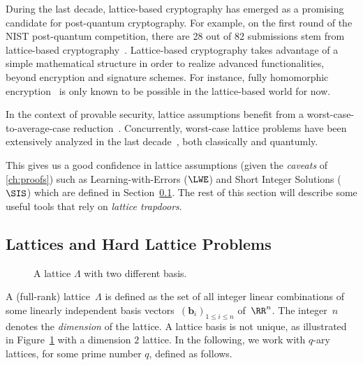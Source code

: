 
During the last decade, lattice-based cryptography has emerged as a promising candidate for post-quantum cryptography.
For example, on the first round of the NIST post-quantum competition, there are 28 out of 82 submissions stem from lattice-based cryptography~\cite{NIS17}.
Lattice-based cryptography takes advantage of a simple mathematical structure in order to realize advanced functionalities, beyond encryption and signature schemes.
For instance, fully homomorphic encryption~\cite{Gen09,GSW13} is only known to be possible in the lattice-based world for now.

In the context of provable security, lattice assumptions benefit from a worst-case-to-average-case reduction~\cite{Reg05,GPV08,MP12,AFG14}.
Concurrently, worst-case lattice problems have been extensively analyzed in the last decade~\cite{ADS15,ADRS15,HK17}, both classically and quantumly.

This gives us a good confidence in lattice assumptions (given the \emph{caveats} of \cref{ch:proofs}) such as Learning-with-Errors ($\LWE$) and Short Integer Solutions ($\SIS$) which are defined in Section~\ref{sse:lattice-problems}. The rest of this section will describe some useful tools that rely on \emph{lattice trapdoors}.

\subsection{Lattices and Hard Lattice Problems}
\label{sse:lattice-problems}

\begin{figure}
  \centering
  
  \caption{A lattice $\Lambda$ with two different basis.}
  \label{fig:lattice-basis}
\end{figure}

A (full-rank) lattice~$\Lambda$ is defined as the set of all integer linear combinations of some linearly independent basis vectors~$(\mathbf{b}_i^{})^{}_{1\leq i \leq n}$ of~$\RR^n_{}$.
The integer~$n$ denotes the \emph{dimension} of the lattice.
A lattice basis is not unique, as illustrated in Figure~\ref{fig:lattice-basis} with a dimension $2$ lattice.
In the following, we work with $q$-ary lattices, for some prime number $q$, defined as follows.


